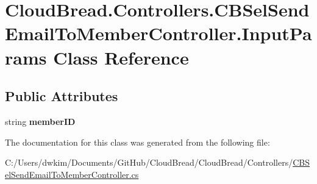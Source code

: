 \hypertarget{class_cloud_bread_1_1_controllers_1_1_c_b_sel_send_email_to_member_controller_1_1_input_params}{}\section{Cloud\+Bread.\+Controllers.\+C\+B\+Sel\+Send\+Email\+To\+Member\+Controller.\+Input\+Params Class Reference}
\label{class_cloud_bread_1_1_controllers_1_1_c_b_sel_send_email_to_member_controller_1_1_input_params}
\subsection*{Public Attributes}
\begin{DoxyCompactItemize}
\item 
string {\bfseries member\+ID}\hypertarget{class_cloud_bread_1_1_controllers_1_1_c_b_sel_send_email_to_member_controller_1_1_input_params_a72817037da0ca32e00422872fd83da04}{}\label{class_cloud_bread_1_1_controllers_1_1_c_b_sel_send_email_to_member_controller_1_1_input_params_a72817037da0ca32e00422872fd83da04}

\end{DoxyCompactItemize}


The documentation for this class was generated from the following file\+:\begin{DoxyCompactItemize}
\item 
C\+:/\+Users/dwkim/\+Documents/\+Git\+Hub/\+Cloud\+Bread/\+Cloud\+Bread/\+Controllers/\hyperlink{_c_b_sel_send_email_to_member_controller_8cs}{C\+B\+Sel\+Send\+Email\+To\+Member\+Controller.\+cs}\end{DoxyCompactItemize}
